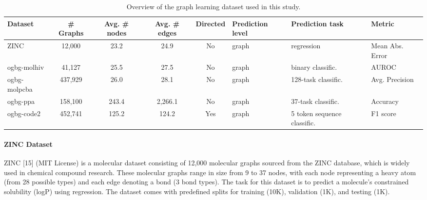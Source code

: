 \documentclass{acmart}
\begin{document}
\begin{table}[htbp]
\centering
\caption{Overview of the graph learning dataset \cite{ref1, ref2, ref3, ref4, ref5} used in this study.}
\begin{tabular}{|l|c|c|c|c|l|l|}
\hline
\textbf{Dataset}      & \textbf{\# Graphs} & \textbf{Avg. \# nodes} & \textbf{Avg. \# edges} & \textbf{Directed} & \textbf{Prediction level} & \textbf{Prediction task}         & \textbf{Metric}        \\ \hline
ZINC                  & 12,000             & 23.2                  & 24.9                  & No                & graph                     & regression                   & Mean Abs. Error  \\ \hline
ogbg-molhiv           & 41,127             & 25.5                  & 27.5                  & No                & graph                     & binary classific.            & AUROC            \\ \hline
ogbg-molpcba          & 437,929            & 26.0                  & 28.1                  & No                & graph                     & 128-task classific.          & Avg. Precision   \\ \hline
ogbg-ppa              & 158,100            & 243.4                 & 2,266.1               & No                & graph                     & 37-task classific.           & Accuracy         \\ \hline
ogbg-code2            & 452,741            & 125.2                 & 124.2                 & Yes               & graph                     & 5 token sequence classific.  & F1 score         \\ \hline
\end{tabular}
\end{table} 



\paragraph{ZINC Dataset}
ZINC [15] (MIT License) is a molecular dataset consisting of 12,000 molecular graphs sourced from the ZINC database, which is widely used in chemical compound research. These molecular graphs range in size from 9 to 37 nodes, with each node representing a heavy atom (from 28 possible types) and each edge denoting a bond (3 bond types). The task for this dataset is to predict a molecule’s constrained solubility (logP) using regression. The dataset comes with predefined splits for training (10K), validation (1K), and testing (1K).
\end{document}
